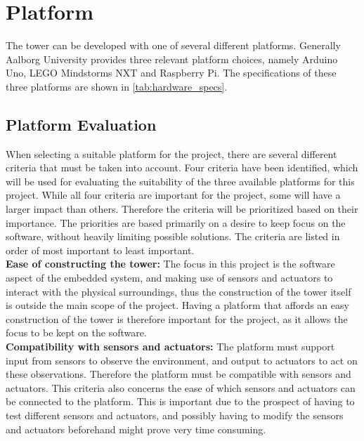 \section{Platform}\label{sec:platform}
The tower can be developed with one of several different platforms. Generally Aalborg University provides three relevant platform choices, namely Arduino Uno, LEGO Mindstorms NXT and Raspberry Pi. The specifications of these three platforms are shown in \cref{tab:hardware_specs}.


\medskip

\subsection{Platform Evaluation}
When selecting a suitable platform for the project, there are several different criteria that must be taken into account. Four criteria have been identified, which will be used for evaluating the suitability of the three available platforms for this project. While all four criteria are important for the project, some will have a larger impact than others. Therefore the criteria will be prioritized based on their importance. The priorities are based primarily on a desire to keep focus on the software, without heavily limiting possible solutions. The criteria are listed in order of most important to least important. \\

\textbf{Ease of constructing the tower:} The focus in this project is the software aspect of the embedded system, and making use of sensors and actuators to interact with the physical surroundings, thus the construction of the tower itself is outside the main scope of the project. Having a platform that affords an easy construction of the tower is therefore important for the project, as it allows the focus to be kept on the software. \\

\textbf{Compatibility with sensors and actuators:} The platform must support input from sensors to observe the environment, and output to actuators to act on these observations. Therefore the platform must be compatible with sensors and actuators. This criteria also concerns the ease of which sensors and actuators can be connected to the platform. This is important due to the prospect of having to test different sensors and actuators, and possibly having to modify the sensors and actuators beforehand might prove very time consuming. \\

